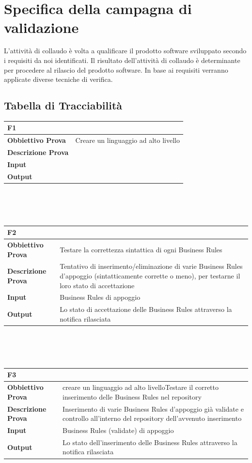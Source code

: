 \documentclass[11pt,titlepage,a4paper]{report}
\begin{document}
\section{Specifica della campagna di validazione}
L'attivit\`a di collaudo \`e volta a qualificare il prodotto software sviluppato secondo i requisiti da noi identificati. Il risultato dell'attivit\`a di collaudo \`e determinante per procedere al rilascio del prodotto software. In base ai requisiti verranno applicate diverse tecniche di verifica.\subsection{Tabella di Tracciabilit\`a}
\begin{tabular}{||p{4.5cm}||p{7.5cm}||}
\hline
\textbf{\textsf{F1}}& \\
\hline
{\textbf {Obbiettivo Prova}}& Creare un linguaggio ad alto livello \\ \hline
{\textbf{Descrizione Prova}}&  \\ \hline
{\textbf{Input}}&  \\ \hline
{\textbf{Output}}& \\ \hline
\end{tabular} \\
\\
\\
\begin{tabular}{||p{4.5cm}||p{7.5cm}||}
\hline
\textbf{\textsf{F2}}& \\
\hline
{\textbf {Obbiettivo Prova}}& Testare la correttezza sintattica di ogni Business Rules \\ \hline
{\textbf{Descrizione Prova}}& Tentativo di inserimento/eliminazione di varie Business Rules d'appoggio (sintatticamente corrette o meno), per testarne il loro stato di accettazione \\ \hline
{\textbf{Input}}& Business Rules di appoggio \\ \hline
{\textbf{Output}}& Lo stato di accettazione delle Business Rules attraverso la notifica rilasciata \\ \hline
\end{tabular} \\
\\
\\
\begin{tabular}{||p{4.5cm}||p{7.5cm}||}
\hline
\textbf{\textsf{F3}}& \\
\hline
{\textbf {Obbiettivo Prova}}& creare un linguaggio ad alto livelloTestare il corretto inserimento delle Business Rules nel repository\\ \hline
{\textbf{Descrizione Prova}}&  Inserimento di varie Business Rules d'appoggio gi\`a validate e controllo all'interno del repository dell'avvenuto inserimento\\ \hline
{\textbf{Input}}& Business Rules (validate) di appoggio \\ \hline
{\textbf{Output}}& Lo stato dell'inserimento delle Business Rules attraverso la notifica rilasciata \\ \hline
\end{tabular} \\
\end{document}

